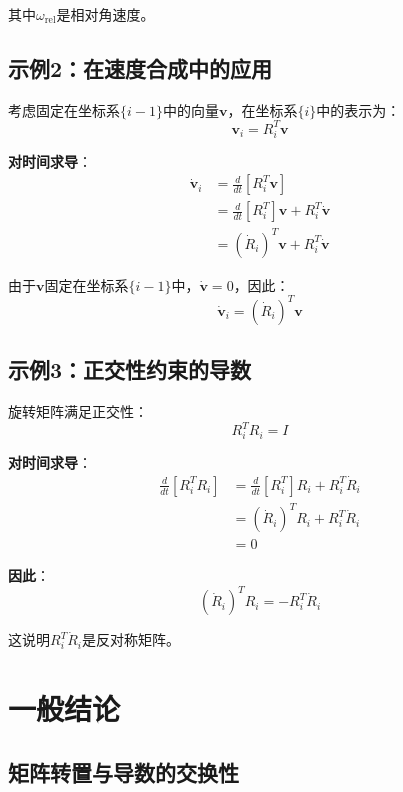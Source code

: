 \documentclass[12pt,a4paper]{article}
\begin{document}
其中$\omega_{\text{rel}}$是相对角速度。

\subsection{示例2：在速度合成中的应用}

考虑固定在坐标系$\{i-1\}$中的向量$\mathbf{v}$，在坐标系$\{i\}$中的表示为：
\begin{equation}
\mathbf{v}_i = R_i^T \mathbf{v}
\end{equation}

\textbf{对时间求导}：
\begin{align}
\dot{\mathbf{v}}_i &= \frac{d}{dt}[R_i^T \mathbf{v}] \\
&= \frac{d}{dt}[R_i^T] \mathbf{v} + R_i^T \dot{\mathbf{v}} \\
&= (\dot{R}_i)^T \mathbf{v} + R_i^T \dot{\mathbf{v}}
\end{align}

由于$\mathbf{v}$固定在坐标系$\{i-1\}$中，$\dot{\mathbf{v}} = 0$，因此：
\begin{equation}
\dot{\mathbf{v}}_i = (\dot{R}_i)^T \mathbf{v}
\end{equation}

\subsection{示例3：正交性约束的导数}

旋转矩阵满足正交性：
\begin{equation}
R_i^T R_i = I
\end{equation}

\textbf{对时间求导}：
\begin{align}
\frac{d}{dt}[R_i^T R_i] &= \frac{d}{dt}[R_i^T] R_i + R_i^T \dot{R}_i \\
&= (\dot{R}_i)^T R_i + R_i^T \dot{R}_i \\
&= 0
\end{align}

\textbf{因此}：
\begin{equation}
(\dot{R}_i)^T R_i = -R_i^T \dot{R}_i
\end{equation}

这说明$R_i^T \dot{R}_i$是反对称矩阵。

\section{一般结论}

\subsection{矩阵转置与导数的交换性}
\end{document}
